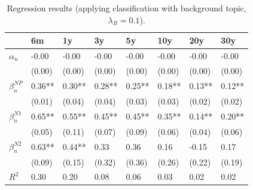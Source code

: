 \documentclass[11pt,a4paper,english,oneside]{book}
\numberwithin{equation}{chapter}
\begin{document}
\begin{table}[h] %
	\centering %
	\begin{tabular}{ p{2cm}  p{1cm} p{1cm} p{1cm} p{1cm} p{1cm} p{1cm} p{1cm} } %
		\toprule %
						& 6m 		& 1y 		& 3y 		& 5y 		& 10y 		& 20y 		& 30y \\
		\midrule %
		$\alpha_n$		& -0.00 	& -0.00 	& -0.00 	& -0.00  	& -0.00 	& -0.00 	& -0.00    \\
						& (0.00) 	& (0.00)  	& (0.00)  	& (0.00) 	& (0.00) 	& (0.00) 	&  (0.00)   \\
		$\beta_n^{NP}$	& 0.36**	&  0.30**	&  	0.28**	&  0.25**	&  0.18**	&  	0.13**	&   0.12**\\
						& (0.01)	&  (0.04)	&  	(0.04)	& (0.03)	&  (0.03)	&  	(0.02)	&  (0.02)   \\
		$\beta_n^{N1}$	& 0.65**	&  0.55**	&   0.45**	&  	0.45**	&  	0.35**	& 0.14**	&  0.20** \\
						&  (0.05)	&  (0.11)	&  	(0.07)	&  	(0.09)	& (0.06)	&  	(0.04)	&  (0.06)  \\
		$\beta_n^{N2}$	& 0.63**	&  0.44**	&  	0.33	&  	0.36	&  0.16		& -0.15		& 0.17\\
						& (0.09)	& (0.15)	&  	(0.32)	&  	(0.36)	& (0.26)	& (0.22)	&  (0.19)  \\
		$R^2$			& 0.30		& 0.20		&  	0.08	&  	0.06	&  	0.03	& 0.02		&  0.02   \\
		
		\bottomrule %
	\end{tabular}
	\caption{Regression results (applying classification with background topic, $\lambda_B=0.1$).} %
	\label{tab:reg2} %
\end{table}
\end{document}
